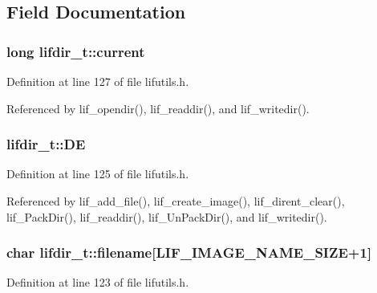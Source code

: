 \subsection{Field Documentation}
\subsubsection[{\texorpdfstring{current}{current}}]{\setlength{\rightskip}{0pt plus 5cm}long lifdir\+\_\+t\+::current}\hypertarget{structlifdir__t_a662534fa317565f8f6992515e1eb39c4}{}\label{structlifdir__t_a662534fa317565f8f6992515e1eb39c4}


Definition at line 127 of file lifutils.\+h.



Referenced by lif\+\_\+opendir(), lif\+\_\+readdir(), and lif\+\_\+writedir().

\subsubsection[{\texorpdfstring{DE}{DE}}]{ lifdir\+\_\+t\+::\+DE}\hypertarget{structlifdir__t_af9247c1579ce3fe0c57db9fd6b56c232}{}\label{structlifdir__t_af9247c1579ce3fe0c57db9fd6b56c232}


Definition at line 125 of file lifutils.\+h.



Referenced by lif\+\_\+add\+\_\+file(), lif\+\_\+create\+\_\+image(), lif\+\_\+dirent\+\_\+clear(), lif\+\_\+\+Pack\+Dir(), lif\+\_\+readdir(), lif\+\_\+\+Un\+Pack\+Dir(), and lif\+\_\+writedir().

\subsubsection[{\texorpdfstring{filename}{filename}}]{\setlength{\rightskip}{0pt plus 5cm}char lifdir\+\_\+t\+::filename\mbox{[}{\bf L\+I\+F\+\_\+\+I\+M\+A\+G\+E\+\_\+\+N\+A\+M\+E\+\_\+\+S\+I\+ZE}+1\mbox{]}}\hypertarget{structlifdir__t_a21bfa7a6d54009982cc63962951ba615}{}\label{structlifdir__t_a21bfa7a6d54009982cc63962951ba615}


Definition at line 123 of file lifutils.\+h.



